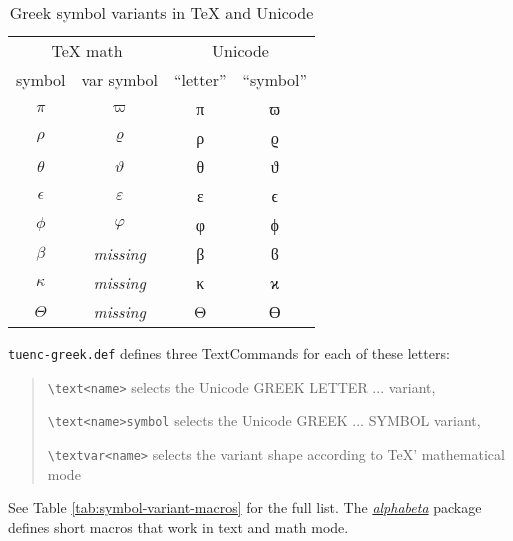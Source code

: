 \documentclass[a4paper]{article}
\begin{document}
\begin{table}[tbp]
  \centering
  \begin{tabular}{cccc}
  \hline
  \multicolumn{2}{c}{TeX math} & \multicolumn{2}{c}{Unicode} \\
  symbol & var symbol & “letter” & “symbol” \\
  \hline
  $\pi$      & $\varpi$       & π & ϖ \\
  $\rho$     & $\varrho$      & ρ & ϱ \\
  $\theta$   & $\vartheta$    & θ & ϑ \\
  \hline
  $\epsilon$ & $\varepsilon$  & ε & ϵ \\
  $\phi$     & $\varphi$      & φ & ϕ \\
  \hline
  $\beta$    & \emph{missing} & β & ϐ \\
  $\kappa$   & \emph{missing} & κ & ϰ \\
  $\Theta$   & \emph{missing} & Θ & ϴ \\
  \hline
  \end{tabular}
  \caption{Greek symbol variants in TeX and Unicode}
  \label{tab:symbol-variants}
\end{table}

\texttt{tuenc-greek.def} defines three TextCommands for each of these
letters:
\begin{quote}
  \verb|\text<name>| selects the Unicode GREEK LETTER ... variant,

  \verb|\text<name>symbol| selects the Unicode
     GREEK ... SYMBOL variant,

  \verb|\textvar<name>| selects the variant
    shape according to TeX' mathematical mode
\end{quote}
See Table \ref{tab:symbol-variant-macros} for the full list. The
\href{alphabeta-doc.pdf}{\emph{alphabeta}} package defines short macros that
work in text and math mode.
\end{document}
